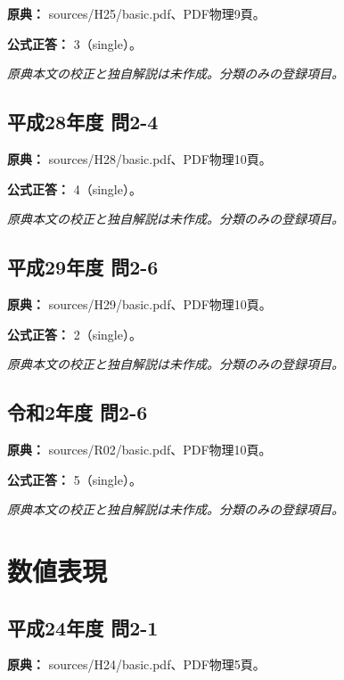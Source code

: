 \noindent\textbf{原典：} sources/H25/basic.pdf、PDF物理9頁。

\textbf{公式正答：} 3（single）。

\par\textit{原典本文の校正と独自解説は未作成。分類のみの登録項目。}

\subsection{平成28年度 問2-4}
\label{q:h28-reg-basic-2-4}

\noindent\textbf{原典：} sources/H28/basic.pdf、PDF物理10頁。

\textbf{公式正答：} 4（single）。

\par\textit{原典本文の校正と独自解説は未作成。分類のみの登録項目。}

\subsection{平成29年度 問2-6}
\label{q:h29-reg-basic-2-6}

\noindent\textbf{原典：} sources/H29/basic.pdf、PDF物理10頁。

\textbf{公式正答：} 2（single）。

\par\textit{原典本文の校正と独自解説は未作成。分類のみの登録項目。}

\subsection{令和2年度 問2-6}
\label{q:r02-reg-basic-2-6}

\noindent\textbf{原典：} sources/R02/basic.pdf、PDF物理10頁。

\textbf{公式正答：} 5（single）。

\par\textit{原典本文の校正と独自解説は未作成。分類のみの登録項目。}

\section{数値表現}

\subsection{平成24年度 問2-1}
\label{q:h24-reg-basic-2-1}

\noindent\textbf{原典：} sources/H24/basic.pdf、PDF物理5頁。

